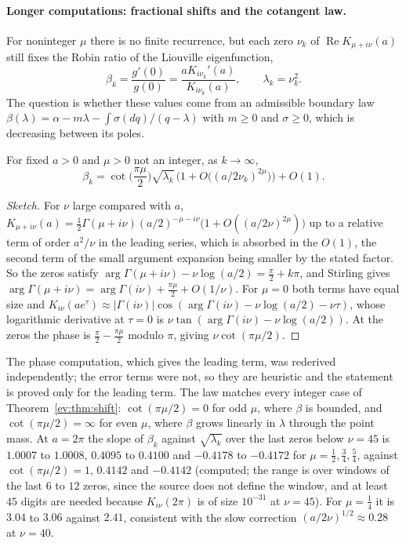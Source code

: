 \paragraph{Longer computations: fractional shifts and the cotangent law.} For noninteger $\mu$ there is no finite recurrence, but each zero $\nu_k$ of $\operatorname{Re}K_{\mu+i\nu}(a)$ still fixes the Robin ratio of the Liouville eigenfunction,
\[
\beta_k=\frac{g'(0)}{g(0)}=\frac{aK_{i\nu_k}'(a)}{K_{i\nu_k}(a)},\qquad\lambda_k=\nu_k^2.
\]
The question is whether these values come from an admissible boundary law $\beta(\lambda)=\alpha-m\lambda-\int\sigma(dq)/(q-\lambda)$ with $m\ge0$ and $\sigma\ge0$, which is decreasing between its poles.

\begin{proposition}\label{ev:prop:cot}
For fixed $a>0$ and $\mu>0$ not an integer, as $k\to\infty$,
\[
\beta_k=\cot\!\Big(\frac{\pi\mu}2\Big)\sqrt{\lambda_k}\,\big(1+O\big((a/2\nu_k)^{2\mu}\big)\big)+O(1).
\]
\end{proposition}

\begin{proof}[Sketch]
For $\nu$ large compared with $a$, $K_{\mu+i\nu}(a)=\tfrac12\Gamma(\mu+i\nu)(a/2)^{-\mu-i\nu}\big(1+O((a/2\nu)^{2\mu})\big)$ up to a relative term of order $a^2/\nu$ in the leading series, which is absorbed in the $O(1)$, the second term of the small argument expansion being smaller by the stated factor. So the zeros satisfy $\arg\Gamma(\mu+i\nu)-\nu\log(a/2)=\tfrac\pi2+k\pi$, and Stirling gives $\arg\Gamma(\mu+i\nu)=\arg\Gamma(i\nu)+\tfrac{\pi\mu}2+O(1/\nu)$. For $\mu=0$ both terms have equal size and $K_{i\nu}(ae^\tau)\approx|\Gamma(i\nu)|\cos(\arg\Gamma(i\nu)-\nu\log(a/2)-\nu\tau)$, whose logarithmic derivative at $\tau=0$ is $\nu\tan(\arg\Gamma(i\nu)-\nu\log(a/2))$. At the zeros the phase is $\tfrac\pi2-\tfrac{\pi\mu}2$ modulo $\pi$, giving $\nu\cot(\pi\mu/2)$.
\end{proof}

The phase computation, which gives the leading term, was rederived independently; the error terms were not, so they are heuristic and the statement is proved only for the leading term. The law matches every integer case of Theorem~\ref{ev:thm:shift}: $\cot(\pi\mu/2)=0$ for odd $\mu$, where $\beta$ is bounded, and $\cot(\pi\mu/2)=\infty$ for even $\mu$, where $\beta$ grows linearly in $\lambda$ through the point mass. At $a=2\pi$ the slope of $\beta_k$ against $\sqrt{\lambda_k}$ over the last zeros below $\nu=45$ is $1.0007$ to $1.0008$, $0.4095$ to $0.4100$ and $-0.4178$ to $-0.4172$ for $\mu=\tfrac12,\tfrac34,\tfrac54$, against $\cot(\pi\mu/2)=1$, $0.4142$ and $-0.4142$ (computed; the range is over windows of the last $6$ to $12$ zeros, since the source does not define the window, and at least $45$ digits are needed because $K_{i\nu}(2\pi)$ is of size $10^{-31}$ at $\nu=45$). For $\mu=\tfrac14$ it is $3.04$ to $3.06$ against $2.41$, consistent with the slow correction $(a/2\nu)^{1/2}\approx0.28$ at $\nu=40$.

